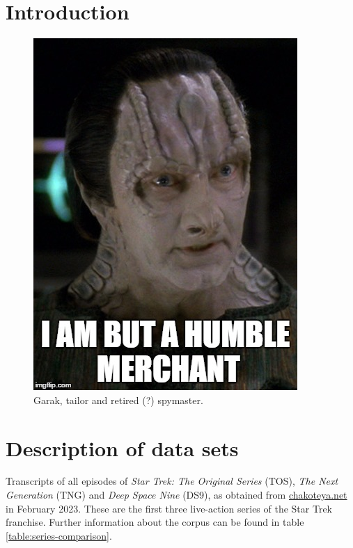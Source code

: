 


\section{Introduction}
\label{sec:startrek_dimensions.introduction}

\begin{figure}[tp!]
  \centering
    \includegraphics[width=0.5\columnwidth]{figures/localized/Garak.jpg}
  \caption{
    Garak, tailor and retired (?) spymaster.
  }
  \label{fig:startrek_dimensions.}
\end{figure}

\section{Description of data sets}
\label{sec:startrek_dimensions.data}

Transcripts of all episodes of \textit{Star Trek: The Original Series} (TOS), \textit{The Next Generation} (TNG) and \textit{Deep Space Nine} (DS9), as obtained from \href{http://chakoteya.net/StarTrek/index.html}{chakoteya.net} in February 2023. These are the first three live-action series of the Star Trek franchise. Further information about the corpus can be found in table \ref{table:series-comparison}.

